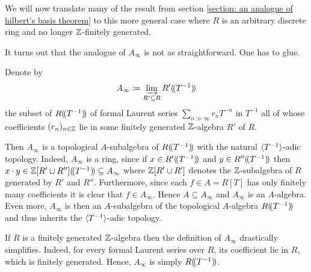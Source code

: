 We will now translate many of the result from section \ref{section: an analogue of hilbert's basis theorem} to this more general case where $R$ is an arbitrary discrete ring and no longer ${\mathbb{Z}}$-finitely generated.

It turns out that the analogue of $A_\infty$ is not as straightforward. One has to glue.
\begin{definition}
	Denote by
	$$A_\infty\coloneqq \varinjlim_{R'\subseteq R} {R'(\!(T^{-1})\!)}$$
	the subset of ${R(\!(T^{-1})\!)}$ of formal Laurent series $\sum_{n\gg \infty} r_n T^{-n}$ in $T^{-1}$ all of whose coefficients $(r_n)_{n\in {\mathbb{Z}}}$ lie in some finitely generated ${\mathbb{Z}}$-algebra $R'$ of $R$.
	
	Then $A_\infty$ is a topological $A$-subalgebra of ${R(\!(T^{-1})\!)}$ with the natural ${\langle T^{-1}\rangle}$-adic topology. Indeed, $A_\infty$ is a ring, since if $x \in {R'(\!(T^{-1})\!)}$ and $y \in {R''(\!(T^{-1})\!)}$ then $x\cdot y\in {{\mathbb{Z}}[R'\cup R''](\!(T^{-1})\!)}\subseteq A_\infty$ where ${\mathbb{Z}}[R'\cup R']$ denotes the ${\mathbb{Z}}$-subalgebra of $R$ generated by $R'$ and $R''$. Furthermore, since each $f\in A=R[T]$ has only finitely many coefficients it is clear that $f\in A_\infty$. Hence $A\subseteq A_\infty$ and $A_\infty$ is an $A$-algebra. Even more, $A_\infty$ is then an $A$-subalgebra of the topological $A$-algebra ${R(\!(T^{-1})\!)}$ and thus inherits the ${\langle T^{-1}\rangle}$-adic topology.
\end{definition}

\begin{remark}
	If $R$ is a finitely generated ${\mathbb{Z}}$-algebra then the definition of $A_\infty$ drastically simplifies. Indeed, for every formal Laurent series over $R$, its coefficient lie in $R$, which is finitely generated. Hence, $A_\infty$ is simply ${R(\!(T^{-1})\!)}$.
\end{remark}

